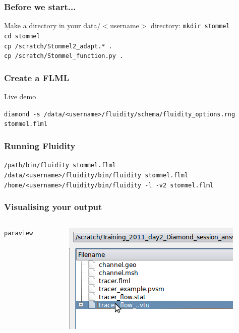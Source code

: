 \documentclass[12pt]{beamer}
\begin{document}
\begin{frame}
    \frametitle{Before we start...}

Make a directory in your data/$<$username$>$ directory: \texttt{mkdir stommel}
\\
\texttt{cd stommel}
\\
\texttt{cp /scratch/Stommel2\_adapt.* .}
\\
\texttt{cp /scratch/Stommel\_function.py .}

\end{frame}


\begin{frame}
    \frametitle{Create a FLML}
Live demo

\texttt{diamond -s /data/<username>/fluidity/schema/fluidity\_options.rng stommel.flml}
\end{frame}

\begin{frame}
    \frametitle{Running Fluidity}
\scriptsize{\texttt{/path/bin/fluidity stommel.flml}}
\\
\scriptsize{\texttt{/data/<username>/fluidity/bin/fluidity stommel.flml}}
\\
\scriptsize{\texttt{/home/<username>/fluidity/bin/fluidity -l -v2 stommel.flml}}
\end{frame}


\begin{frame}
	\frametitle{Visualising your output}
\begin{columns}
\begin{column}{0.6\textwidth}

\texttt{paraview}
\end{column}
\begin{column}{0.4\textwidth}
\begin{center}
\includegraphics[width=\textwidth]{images/State_Open.png}
\end{center}
\end{column}
\end{columns}


\end{frame}
\end{document}
